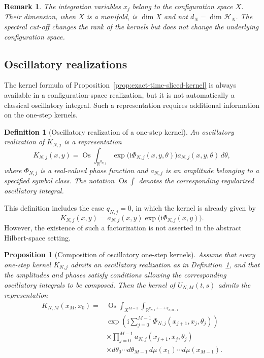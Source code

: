 \documentclass[10pt,a4paper]{amsart}
\newtheorem{proposition}[theorem]{Proposition}
\newtheorem{definition}[theorem]{Definition}
\newtheorem{remark}[theorem]{Remark}
\begin{document}
\begin{remark}
\label{rem:dimension-configuration-space}
The integration variables \(x_{j}\) belong to the configuration space \(X\).
Their dimension, when \(X\) is a manifold, is \(\dim X\) and not
\(d_{N}=\dim\mathcal{H}_{N}\). The spectral cut-off changes the rank of the
kernels but does not change the underlying configuration space.
\end{remark}


\subsection{Oscillatory realizations}
\label{subsec:oscillatory-realizations}

The kernel formula of
Proposition~\ref{prop:exact-time-sliced-kernel} is always available in a
configuration-space realization, but it is not automatically a classical
oscillatory integral. Such a representation requires additional information
on the one-step kernels.

\begin{definition}[Oscillatory realization of a one-step kernel]
\label{def:oscillatory-one-step-kernel}
An oscillatory realization of \(K_{N,j}\) is a representation
\[
K_{N,j}(x,y)
=
\operatorname{Os}
\int_{\mathbb{R}^{q_{N,j}}}
\exp\bigl(\mathrm{i}\Phi_{N,j}(x,y,\theta)\bigr)
a_{N,j}(x,y,\theta)\,d\theta,
\]
where \(\Phi_{N,j}\) is a real-valued phase function and
\(a_{N,j}\) is an amplitude belonging to a specified symbol class.
The notation \(\operatorname{Os}\int\) denotes the corresponding
regularized oscillatory integral.
\end{definition}

This definition includes the case \(q_{N,j}=0\), in which the kernel is
already given by
\[
K_{N,j}(x,y)
=
a_{N,j}(x,y)
\exp\bigl(\mathrm{i}\Phi_{N,j}(x,y)\bigr).
\]
However, the existence of such a factorization is not asserted in the
abstract Hilbert-space setting.

\begin{proposition}[Composition of oscillatory one-step kernels]
\label{prop:composition-oscillatory-kernels}
Assume that every one-step kernel \(K_{N,j}\) admits an oscillatory
realization as in
Definition~\ref{def:oscillatory-one-step-kernel}, and that the amplitudes and
phases satisfy conditions allowing the corresponding oscillatory integrals
to be composed. Then the kernel of \(U_{N,M}(t,s)\) admits the representation
\[
\begin{split}
K_{N,M}(x_{M},x_{0})
={}&
\operatorname{Os}
\int_{X^{M-1}}
\int_{\mathbb{R}^{q_{N,0}+\cdots+q_{N,M-1}}}
\\
&\exp\left(
\mathrm{i}
\sum_{j=0}^{M-1}
\Phi_{N,j}(x_{j+1},x_{j},\theta_{j})
\right)
\\
&\times
\prod_{j=0}^{M-1}
a_{N,j}(x_{j+1},x_{j},\theta_{j})
\\
&\times
d\theta_{0}\cdots d\theta_{M-1}
\,d\mu(x_{1})\cdots d\mu(x_{M-1}).
\end{split}
\]
\end{proposition}
\end{document}
